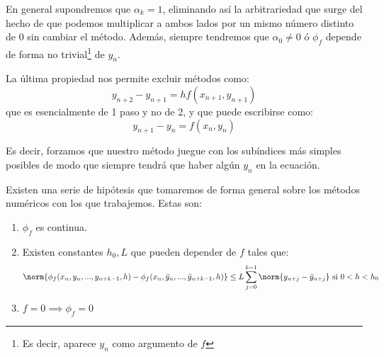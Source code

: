 En general supondremos que $α_k=1$, eliminando así la arbitrariedad que surge del hecho de que podemos multiplicar a ambos lados por un mismo número distinto de 0 sin cambiar el método. Además, siempre tendremos que $α_0 \neq 0$ ó $\phi_f$ depende de forma no trivial\footnote{Es decir, aparece $y_n$ como argumento de $f$} de $y_n$.

La última propiedad nos permite excluir métodos como:
\[y_{n+2}-y_{n+1}=hf(x_{n+1},y_{n+1})\]
que es esencialmente de 1 paso y no de 2, y que puede escribirse como:
\[y_{n+1}-y_n = f(x_n,y_n)\]

Es decir, forzamos que nuestro método juegue con los subíndices más simples posibles de modo que siempre tendrá que haber algún $y_n$ en la ecuación.

\begin{prop}
Existen una serie de hipótesis que tomaremos de forma general sobre los métodos numéricos con los que trabajemos. Estas son:

\begin{enumerate}
\item $\phi_f$ es continua.

\item Existen constantes $h_0,L$ que pueden depender de $f$ tales que:
\[\norm{\phi_f(x_n,y_n,...,y_{n+k-1},h) - \phi_f(x_n,\tilde{y}_n,...,\tilde{y}_{n+k-1},h)}\leq L \sum_{j=0}^{k-1} \norm{y_{n+j}-\tilde{y}_{n+j}} \text{ si } 0 < h < h_0\]

\item $f= 0 \implies \phi_f=0$


\end{enumerate}
\end{prop}


